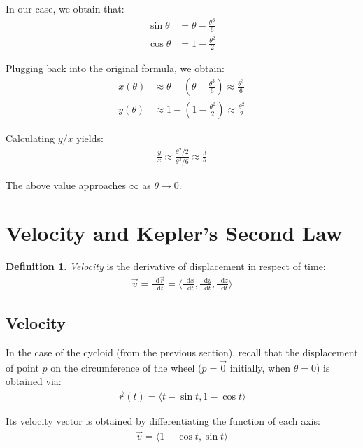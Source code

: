 \documentclass[12pt]{article}
\newcommand{\iv}[1]{\langle #1 \rangle}
\newcommand*\diff{\mathop{}\!\mathrm{d}}
\theoremstyle{definition}
\newtheorem{defn}{Definition}[section]
\begin{document}
 	In our case, we obtain that:
 	\begin{align*}
 		\sin \theta &= \theta - \frac{\theta^3}{6} \\
 		\cos \theta &= 1 - \frac{\theta^2}{2}
 	\end{align*}
 	
 	Plugging back into the original formula, we obtain:
 	\begin{align*}
 		x(\theta) &\approx \theta - (\theta - \frac{\theta^3}{6}) \approx \frac{\theta^3}{6} \\
 		y(\theta) &\approx 1 - (1 - \frac{\theta^2}{2}) \approx \frac{\theta^2}{2}
 	\end{align*}
 	
 	Calculating $y/x$ yields:
 	\begin{gather*}
 		\frac{y}{x} \approx \frac{\theta^2 / 2}{\theta^3 / 6} \approx \frac{3}{\theta}
 	\end{gather*}
 	
 	The above value approaches $\infty$ as $\theta \to 0$.
 	
 	\section{Velocity and Kepler's Second Law}
	
	\begin{defn}
		\emph{Velocity} is the derivative of displacement in respect of time:
		\begin{gather*}
			\vec{v} = \frac{\diff \vec{r}}{\diff t} = \iv{\frac{\diff x}{\diff t}, \frac{\diff y}{\diff t}, \frac{\diff z}{\diff t}}
		\end{gather*}
	\end{defn}
	
	\subsection{Velocity}
	
	In the case of the cycloid (from the previous section), recall that the displacement of point $p$ on the circumference of the wheel ($p = \vec{0}$ initially, when $\theta = 0$) is obtained via:
	\begin{gather*}
		\vec{r}(t) = \iv{t - \sin t, 1 - \cos t}
	\end{gather*}
	
	Its velocity vector is obtained by differentiating the function of each axis:
	\begin{gather*}
		\vec{v} = \iv{1 - \cos t, \sin t}
	\end{gather*}
	
\end{document}
